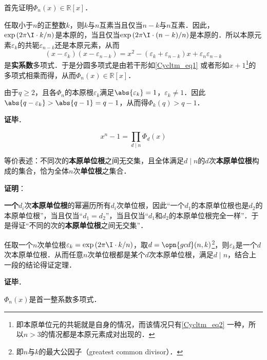 首先证明$\Phi_n(x)\in\mathbb{R}[x]$．

任取小于$n$的正整数$k$，则$k$与$n$互素当且仅当$n-k$与$n$互素．因此，$\exp{(2\pi\I\cdot  k/n)}$是本原的，当且仅当$\exp{(2\pi\I\cdot  (n-k)/n)}$是本原的．所以本原元素$\varepsilon_k$的共轭$\varepsilon_{n-k}$还是本原元素，从而
\begin{equation}\label{Cycltm_eq1}
(x-\varepsilon_k)(x-\varepsilon_{n-k})=x^2-(\varepsilon_k+\varepsilon_{n-k})x+\varepsilon_n\varepsilon_{n-k}
\end{equation}
是\textbf{实系数}多项式．于是分圆多项式是由若干形如\autoref{Cycltm_eq1} 或者形如$x+1$\footnote{即本原单位元的共轭就是自身的情况，而该情况只有\autoref{Cycltm_eq2} 一种，所以$n>3$的情况都是本原元素成对出现的．}的多项式相乘而得，从而$\Phi_n(x)\in\mathbb{R}[x]$．

由于$q\geq 2$，且各$\Phi_n$的本原根$\varepsilon_k$满足$\abs{\varepsilon_k}=1$，$\varepsilon_k\neq 1$．因此$\abs{q-\varepsilon_k}>\abs{q-1}=q-1$，从而得$\Phi_k(q)>q-1$．


\textbf{证毕}．




\begin{theorem}{}\label{Cycltm_the1}
\begin{equation}
x^n-1 = \prod_{d\mid n}\Phi_d(x)
\end{equation}

等价表述：不同次的\textbf{本原单位根}之间无交集，且全体满足$d\mid n$的$d$次\textbf{本原单位根}构成的集合，恰为全体$n$次\textbf{单位根}之集合．
\end{theorem}

\textbf{证明}：

\textbf{一个}$d_i$次\textbf{本原单位根}的幂遍历所有$d_i$次单位根，因此“一个$d_1$的本原单位根也是$d_2$的本原单位根”，当且仅当“$d_1=d_2$”，当且仅当“$d_1$和$d_2$的本原单位根完全一样”．于是得证“不同的次的\textbf{本原单位根}之间无交集”．

任取一个$n$次单位根$\varepsilon_k=\exp{(2\pi\I\cdot  k/n)}$，取$d=\opn{gcd}(n, k)$\footnote{即$n$与$k$的最大公因子（greatest common divisor）．}，则$\varepsilon_k$是一个$d$次本原单位根．从而任意$n$次单位根都是某个$d$次本原单位根，满足$d\mid n$，结合上一段的结论得证定理．

\textbf{证毕}．



\begin{theorem}{}\label{Cycltm_the2}
$\Phi_n(x)$是首一整系数多项式．
\end{theorem}


